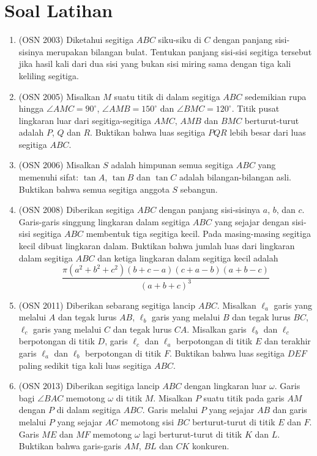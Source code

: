 \documentclass[12pt]{scrartcl}
\begin{document}
\section{Soal Latihan}
\begin{enumerate}
    \item (OSN 2003) Diketahui segitiga $ABC$ siku-siku di $C$ dengan panjang sisi-sisinya merupakan bilangan bulat. Tentukan panjang sisi-sisi segitiga tersebut jika hasil kali dari dua sisi yang bukan sisi miring sama dengan tiga kali keliling segitiga.

    \item (OSN 2005) Misalkan $M$ suatu titik di dalam segitiga $ABC$ sedemikian rupa hingga $\angle AMC = 90^\circ$, $\angle AMB = 150^\circ$ dan $\angle BMC = 120^\circ$. Titik pusat lingkaran luar dari segitiga-segitiga $AMC$, $AMB$ dan $BMC$ berturut-turut adalah $P$, $Q$ dan $R$. Buktikan bahwa luas segitiga $PQR$ lebih besar dari luas segitiga $ABC$.

    \item (OSN 2006) Misalkan $S$ adalah himpunan semua segitiga $ABC$ yang memenuhi sifat: $\tan A$, $\tan B$ dan $\tan C$ adalah bilangan-bilangan asli. Buktikan bahwa semua segitiga anggota $S$ sebangun.

    \item (OSN 2008) Diberikan segitiga $ABC$ dengan panjang sisi-sisinya $a$, $b$, dan $c$. Garis-garis singgung lingkaran dalam segitiga $ABC$ yang sejajar dengan sisi-sisi segitiga $ABC$ membentuk tiga segitiga kecil. Pada masing-masing segitiga kecil dibuat lingkaran dalam. Buktikan bahwa jumlah luas dari lingkaran dalam segitiga $ABC$ dan ketiga lingkaran dalam segitiga kecil adalah
    \[\frac{\pi(a^2 + b^2 + c^2)(b + c - a)(c + a - b)(a + b - c)}{(a + b + c)^3}\]

    \item (OSN 2011) Diberikan sebarang segitiga lancip $ABC$. Misalkan $\ell_a$ garis yang melalui $A$ dan tegak lurus $AB$, $\ell_b$ garis yang melalui $B$ dan tegak lurus $BC$, $\ell_c$ garis yang melalui $C$ dan tegak lurus $CA$. Misalkan garis $\ell_b$ dan $\ell_c$ berpotongan di titik $D$, garis $\ell_c$ dan $\ell_a$ berpotongan di titik $E$ dan terakhir garis $\ell_a$ dan $\ell_b$ berpotongan di titik $F$. Buktikan bahwa luas segitiga $DEF$ paling sedikit tiga kali luas segitiga $ABC$.

    \item (OSN 2013) Diberikan segitiga lancip $ABC$ dengan lingkaran luar $\omega$. Garis bagi $\angle BAC$ memotong $\omega$ di titik $M$. Misalkan $P$ suatu titik pada garis $AM$ dengan $P$ di dalam segitiga $ABC$. Garis melalui $P$ yang sejajar $AB$ dan garis melalui $P$ yang sejajar $AC$ memotong sisi $BC$ berturut-turut di titik $E$ dan $F$. Garis $ME$ dan $MF$ memotong $\omega$ lagi berturut-turut di titik $K$ dan $L$. Buktikan bahwa garis-garis $AM$, $BL$ dan $CK$ konkuren.


\end{enumerate}
\end{document}
